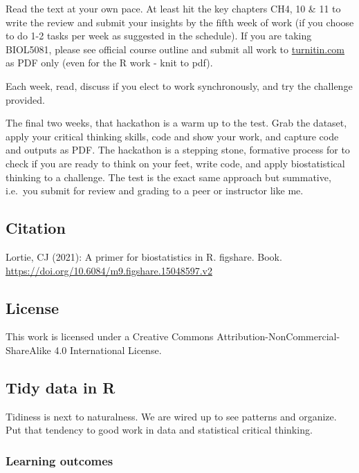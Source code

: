 \documentclass[
]{book}
\begin{document}
Read the text at your own pace. At least hit the key chapters CH4, 10 \& 11 to write the review and submit your insights by the fifth week of work (if you choose to do 1-2 tasks per week as suggested in the schedule). If you are taking BIOL5081, please see official course outline and submit all work to \href{https://www.turnitin.com}{turnitin.com} as PDF only (even for the R work - knit to pdf).

Each week, read, discuss if you elect to work synchronously, and try the challenge provided.

The final two weeks, that hackathon is a warm up to the test. Grab the dataset, apply your critical thinking skills, code and show your work, and capture code and outputs as PDF. The hackathon is a stepping stone, formative process for to check if you are ready to think on your feet, write code, and apply biostatistical thinking to a challenge. The test is the exact same approach but summative, i.e.~you submit for review and grading to a peer or instructor like me.

\hypertarget{citation}{%
\subsection*{Citation}\label{citation}}

Lortie, CJ (2021): A primer for biostatistics in R. figshare. Book. \url{https://doi.org/10.6084/m9.figshare.15048597.v2}

\hypertarget{license}{%
\subsection*{License}\label{license}}

This work is licensed under a Creative Commons Attribution-NonCommercial-ShareAlike 4.0 International License.

\hypertarget{tidy-data-in-r}{%
\subsection*{Tidy data in R}\label{tidy-data-in-r}}

Tidiness is next to naturalness. We are wired up to see patterns and organize. Put that tendency to good work in data and statistical critical thinking.

\hypertarget{learning-outcomes-1}{%
\subsubsection*{Learning outcomes}\label{learning-outcomes-1}}
\end{document}
